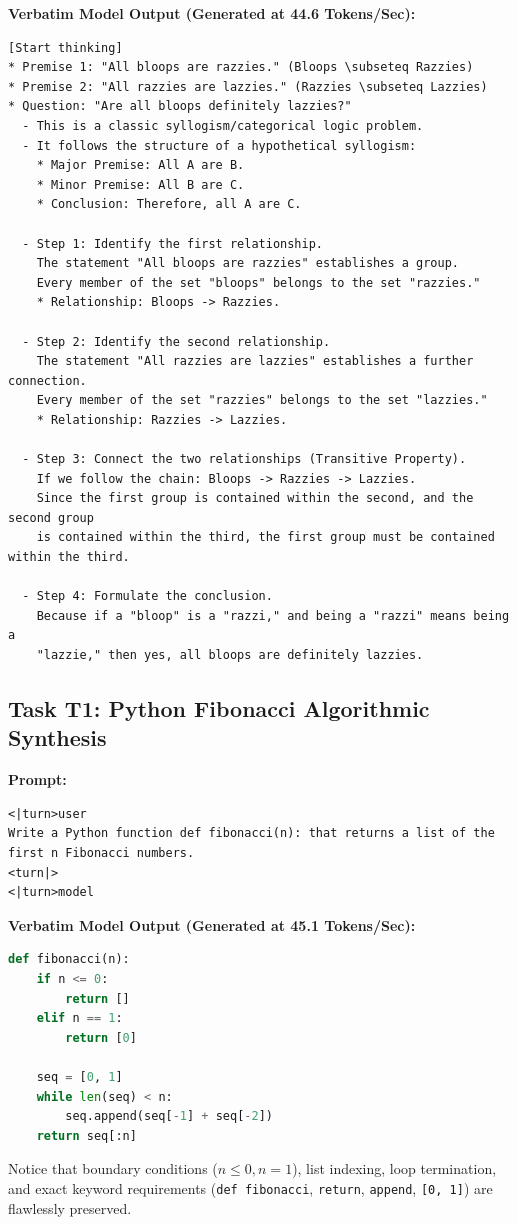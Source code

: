 \documentclass[final]{article}
\begin{document}
\textbf{Verbatim Model Output (Generated at 44.6 Tokens/Sec):}
\begin{lstlisting}[language=text]
[Start thinking]
* Premise 1: "All bloops are razzies." (Bloops \subseteq Razzies)
* Premise 2: "All razzies are lazzies." (Razzies \subseteq Lazzies)
* Question: "Are all bloops definitely lazzies?"
  - This is a classic syllogism/categorical logic problem.
  - It follows the structure of a hypothetical syllogism:
    * Major Premise: All A are B.
    * Minor Premise: All B are C.
    * Conclusion: Therefore, all A are C.

  - Step 1: Identify the first relationship.
    The statement "All bloops are razzies" establishes a group. 
    Every member of the set "bloops" belongs to the set "razzies."
    * Relationship: Bloops -> Razzies.

  - Step 2: Identify the second relationship.
    The statement "All razzies are lazzies" establishes a further connection. 
    Every member of the set "razzies" belongs to the set "lazzies."
    * Relationship: Razzies -> Lazzies.

  - Step 3: Connect the two relationships (Transitive Property).
    If we follow the chain: Bloops -> Razzies -> Lazzies.
    Since the first group is contained within the second, and the second group 
    is contained within the third, the first group must be contained within the third.

  - Step 4: Formulate the conclusion.
    Because if a "bloop" is a "razzi," and being a "razzi" means being a 
    "lazzie," then yes, all bloops are definitely lazzies.
\end{lstlisting}

\subsection{Task T1: Python Fibonacci Algorithmic Synthesis}

\textbf{Prompt:}
\begin{lstlisting}[language=text]
<|turn>user
Write a Python function def fibonacci(n): that returns a list of the first n Fibonacci numbers.
<turn|>
<|turn>model
\end{lstlisting}

\textbf{Verbatim Model Output (Generated at 45.1 Tokens/Sec):}
\begin{lstlisting}[language=Python]
def fibonacci(n):
    if n <= 0:
        return []
    elif n == 1:
        return [0]
    
    seq = [0, 1]
    while len(seq) < n:
        seq.append(seq[-1] + seq[-2])
    return seq[:n]
\end{lstlisting}

Notice that boundary conditions ($n \le 0, n = 1$), list indexing, loop termination, and exact keyword requirements (\texttt{def fibonacci}, \texttt{return}, \texttt{append}, \texttt{[0, 1]}) are flawlessly preserved.
\end{document}
